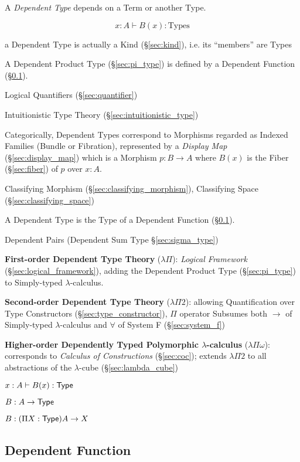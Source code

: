 A \emph{Dependent Type} depends on a Term or another Type.

\[
  x : A \vdash B(x):\mathrm{Types}
\]

a Dependent Type is actually a Kind (\S\ref{sec:kind}), i.e. its
``members'' are Types

A Dependent Product Type (\S\ref{sec:pi_type}) is defined by
a Dependent Function (\S\ref{sec:dependent_function}).

Logical Quantifiers (\S\ref{sec:quantifier})

Intuitionistic Type Theory (\S\ref{sec:intuitionistic_type})

Categorically, Dependent Types correspond to Morphisms regarded as
Indexed Families (Bundle or Fibration), represented by a \emph{Display
  Map} (\S\ref{sec:display_map}) which is a Morphism $p : B
\rightarrow A$ where $B(x)$ is the Fiber (\S\ref{sec:fiber}) of $p$
over $x:A$.

Classifying Morphism (\S\ref{sec:classifying_morphism}),
Classifying Space (\S\ref{sec:classifying_space})

A Dependent Type is the Type of a Dependent Function
(\S\ref{sec:dependent_function}).

Dependent Pairs (Dependent Sum Type \S\ref{sec:sigma_type})


\textbf{First-order Dependent Type Theory} ($\lambda \Pi$):
\emph{Logical Framework} (\S\ref{sec:logical_framework}), adding the
Dependent Product Type (\S\ref{sec:pi_type}) to Simply-typed
$\lambda$-calculus.


\textbf{Second-order Dependent Type Theory} ($\lambda \Pi 2$):
allowing Quantification over Type Constructors
(\S\ref{sec:type_constructor}), $\Pi$ operator Subsumes both
$\rightarrow$ of Simply-typed $\lambda$-calculus and $\forall$ of
System F (\S\ref{sec:system_f})


\textbf{Higher-order Dependently Typed Polymorphic $\lambda$-calculus}
($\lambda \Pi \omega$): corresponds to \emph{Calculus of
  Constructions} (\S\ref{sec:coc}); extends $\lambda \Pi 2$ to all
abstractions of the $\lambda$-cube (\S\ref{sec:lambda_cube})


\asterism


$x:A \vdash B(x):\mathsf{Type}$

$B : A \rightarrow \mathsf{Type}$

$B : (\Pi X:\mathsf{Type}) A \rightarrow X$



\subsection{Dependent Function}\label{sec:dependent_function}

